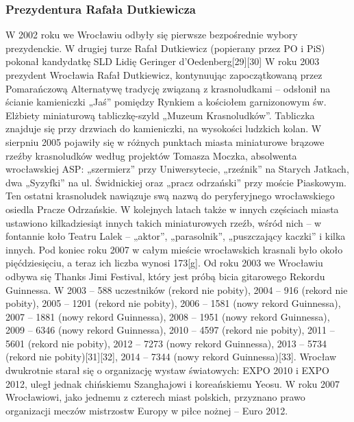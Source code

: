 \documentclass{article}
\begin{document}
\subsubsection{Prezydentura Rafała Dutkiewicza}
\vspace{3mm} %
\newline W 2002 roku we Wrocławiu odbyły się pierwsze bezpośrednie wybory prezydenckie. W drugiej turze Rafał Dutkiewicz (popierany przez PO i PiS) pokonał kandydatkę SLD Lidię Geringer d’Oedenberg[29][30]
\vspace{3mm} %
\newline W roku 2003 prezydent Wrocławia Rafał Dutkiewicz, kontynuując zapoczątkowaną przez Pomarańczową Alternatywę tradycję związaną z krasnoludkami – odsłonił na ścianie kamieniczki „Jaś” pomiędzy Rynkiem a kościołem garnizonowym św. Elżbiety miniaturową tabliczkę-szyld „Muzeum Krasnoludków”. Tabliczka znajduje się przy drzwiach do kamieniczki, na wysokości ludzkich kolan. W sierpniu 2005 pojawiły się w różnych punktach miasta miniaturowe brązowe rzeźby krasnoludków według projektów Tomasza Moczka, absolwenta wrocławskiej ASP: „szermierz” przy Uniwersytecie, „rzeźnik” na Starych Jatkach, dwa „Syzyfki” na ul. Świdnickiej oraz „pracz odrzański” przy moście Piaskowym. Ten ostatni krasnoludek nawiązuje swą nazwą do peryferyjnego wrocławskiego osiedla Pracze Odrzańskie. W kolejnych latach także w innych częściach miasta ustawiono kilkadziesiąt innych takich miniaturowych rzeźb, wśród nich – w fontannie koło Teatru Lalek – „aktor”, „parasolnik”, „puszczający kaczki” i kilka innych. Pod koniec roku 2007 w całym mieście wrocławskich krasnali było około pięćdziesięciu, a teraz ich liczba wynosi 173[g].
\vspace{3mm} %
\newline Od roku 2003 we Wrocławiu odbywa się Thanks Jimi Festival, który jest próbą bicia gitarowego Rekordu Guinnessa. W 2003 – 588 uczestników (rekord nie pobity), 2004 – 916 (rekord nie pobity), 2005 – 1201 (rekord nie pobity), 2006 – 1581 (nowy rekord Guinnessa), 2007 – 1881 (nowy rekord Guinnessa), 2008 – 1951 (nowy rekord Guinnessa), 2009 – 6346 (nowy rekord Guinnessa), 2010 – 4597 (rekord nie pobity), 2011 – 5601 (rekord nie pobity), 2012 – 7273 (nowy rekord Guinnessa), 2013 – 5734 (rekord nie pobity)[31][32], 2014 – 7344 (nowy rekord Guinnessa)[33].
\vspace{3mm} %
\newline Wrocław dwukrotnie starał się o organizację wystaw światowych: EXPO 2010 i EXPO 2012, uległ jednak chińskiemu Szanghajowi i koreańskiemu Yeosu. W roku 2007 Wrocławiowi, jako jednemu z czterech miast polskich, przyznano prawo organizacji meczów mistrzostw Europy w piłce nożnej – Euro 2012.
\end{document}
